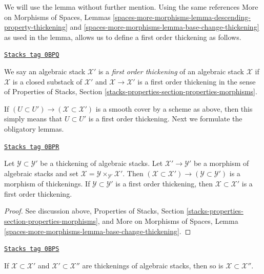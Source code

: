 We will use the lemma without further mention. Using the same references
More on Morphisms of Spaces, Lemmas
\ref{spaces-more-morphisms-lemma-descending-property-thickening} and
\ref{spaces-more-morphisms-lemma-base-change-thickening}
as used in the lemma, allows us to define a first order thickening as follows.

\begin{definition}
\label{stacks-more-morphisms-definition-first-order-thickening}
\href{https://stacks.math.columbia.edu/tag/0BPQ}{\texttt{Stacks tag 0BPQ}}

We say an algebraic stack $\mathcal{X}'$ is a {\it first order thickening}
of an algebraic stack $\mathcal{X}$ if $\mathcal{X}$ is a closed substack
of $\mathcal{X}'$ and $\mathcal{X} \to \mathcal{X}'$ is a first order
thickening in the sense of Properties of Stacks, Section
\ref{stacks-properties-section-properties-morphisms}.
\end{definition}

If $(U \subset U') \to (\mathcal{X} \subset \mathcal{X}')$ is a smooth
cover by a scheme as above, then this simply means that $U \subset U'$
is a first order thickening. Next we formulate the obligatory lemmas.

\begin{lemma}
\label{stacks-more-morphisms-lemma-base-change-thickening}
\href{https://stacks.math.columbia.edu/tag/0BPR}{\texttt{Stacks tag 0BPR}}

Let $\mathcal{Y} \subset \mathcal{Y}'$ be a thickening of algebraic stacks.
Let $\mathcal{X}' \to \mathcal{Y}'$ be a morphism of algebraic stacks
and set $\mathcal{X} = \mathcal{Y} \times_{\mathcal{Y}'} \mathcal{X}'$.
Then
$(\mathcal{X} \subset \mathcal{X}') \to (\mathcal{Y} \subset \mathcal{Y}')$
is a morphism of thickenings. If $\mathcal{Y} \subset \mathcal{Y}'$ is a first
order thickening, then $\mathcal{X} \subset \mathcal{X}'$ is a first
order thickening.
\end{lemma}

\begin{proof}
See discussion above, Properties of Stacks, Section
\ref{stacks-properties-section-properties-morphisms}, and
More on Morphisms of Spaces, Lemma
\ref{spaces-more-morphisms-lemma-base-change-thickening}.
\end{proof}

\begin{lemma}
\label{stacks-more-morphisms-lemma-composition-thickening}
\href{https://stacks.math.columbia.edu/tag/0BPS}{\texttt{Stacks tag 0BPS}}

If $\mathcal{X} \subset \mathcal{X}'$ and $\mathcal{X}' \subset \mathcal{X}''$
are thickenings of algebraic stacks, then so is
$\mathcal{X} \subset \mathcal{X}''$.
\end{lemma}

